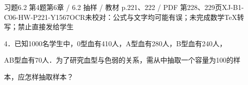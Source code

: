 \begin{bankitem}{习题6.2 第4题}{第6章 / 6.2 抽样 / 教材 p.221、222 / PDF 第228、229页}{XJ-B1-C06-HW-P221-Y1567}{OCR未校对：公式与文字均可能有误；未完成数学TeX转写；禁止直接发给学生}
\begin{ocrdraft}
\par
4．已知1000名学生中，0型血有410人，A型血有280人，B型血有240人，
\par
[教材p.222 / PDF第229页]
\par
AB型血有70人．为了研究血型与色弱的关系，需从中抽取一个容量为100的样
\par
本，应怎样抽取样本？
\end{ocrdraft}
\end{bankitem}
